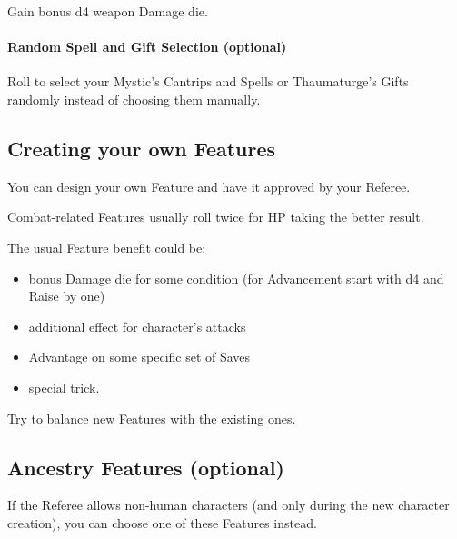 \documentclass[itdr/core]{subfiles}
\begin{document}
\break

\featmt\feathp
Gain bonus d4 weapon Damage die.

\vspace{1ex}

\begin{dbox}
	\paragraph{Random Spell and Gift Selection (optional)}
	Roll to select your Mystic's Cantrips and Spells or Thaumaturge's Gifts randomly instead of \mbox{choosing} them manually.
\end{dbox}

\vspace{-1ex}

\begin{dbox}
\subsection*{Creating your own Features}

You can design your own Feature and have it approved by your Referee.

Combat-related Features usually roll twice for HP taking the better result.

The usual Feature benefit could be:
\begin{itemize}
	\item bonus Damage die for some condition (for Advancement start with d4 and Raise by one)
	\item additional effect for character's attacks
	\item Advantage on some specific set of Saves
	\item special trick.
\end{itemize}

Try to balance new Features with the existing ones.
\vspace*{1ex-\baselineskip}
\end{dbox}

\vfill
\subsection*{Ancestry Features (optional)}

If the Referee allows non-human characters (and only during the new character creation), you can choose one of these Features instead.
\end{document}

